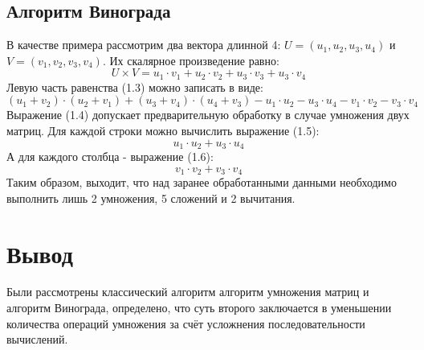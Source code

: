 \subsection{Алгоритм Винограда}
В качестве примера рассмотрим два вектора длинной 4: $U = (u_1, u_2, u_3, u_4)$ и $V = (v_1, v_2, v_3, v_4)$. Их скалярное произведение равно:
\begin{equation}
    U\times{}V = u_1\cdot{}v_1 + u_2\cdot{}v_2 + u_3\cdot{}v_3 + u_3\cdot{}v_4
\end{equation}
Левую часть равенства (1.3) можно записать в виде:
\begin{equation}
    (u_1 + v_2)\cdot{}(u_2 + v_1) + (u_3 + v_4)\cdot{}(u_4 + v_3) - u_1\cdot{}u_2 - u_3\cdot{}u_4 - v_1\cdot{}v_2 - v_3\cdot{}v_4
\end{equation}
Выражение (1.4) допускает предварительную обработку в случае умножения двух матриц. Для каждой строки можно вычислить выражение (1.5):
\begin{equation}
    u_1\cdot{}u_2 + u_3\cdot{}u_4
\end{equation}
А для каждого столбца - выражение (1.6):
\begin{equation}
    v_1\cdot{}v_2 + v_3\cdot{}v_4
\end{equation}
Таким образом, выходит, что над заранее обработанными данными необходимо выполнить лишь 2 умножения, 5 сложений и 2 вычитания.

\section{Вывод}
Были рассмотрены классический алгоритм алгоритм умножения матриц и алгоритм Винограда, определено, что суть второго заключается в уменьшении количества операций умножения за счёт усложнения последовательности вычислений.

